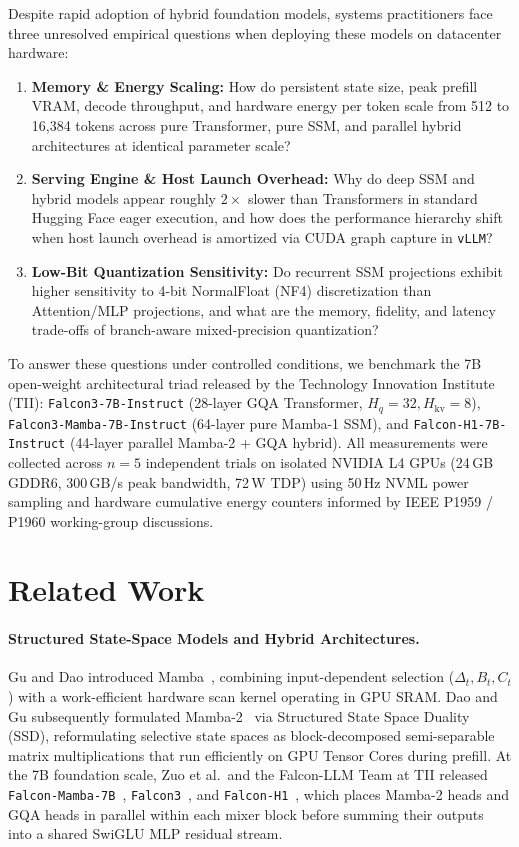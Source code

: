 \documentclass[10pt,a4paper]{article}
\begin{document}
Despite rapid adoption of hybrid foundation models, systems practitioners face three unresolved empirical questions when deploying these models on datacenter hardware:
\begin{enumerate}[leftmargin=1.5em,itemsep=1pt,topsep=2pt,parsep=0pt]
    \item \textbf{Memory \& Energy Scaling:} How do persistent state size, peak prefill VRAM, decode throughput, and hardware energy per token scale from 512 to 16,384 tokens across pure Transformer, pure SSM, and parallel hybrid architectures at identical parameter scale?
    \item \textbf{Serving Engine \& Host Launch Overhead:} Why do deep SSM and hybrid models appear roughly $2\times$ slower than Transformers in standard Hugging Face eager execution, and how does the performance hierarchy shift when host launch overhead is amortized via CUDA graph capture in \texttt{vLLM}?
    \item \textbf{Low-Bit Quantization Sensitivity:} Do recurrent SSM projections exhibit higher sensitivity to 4-bit NormalFloat (NF4) discretization than Attention/MLP projections, and what are the memory, fidelity, and latency trade-offs of branch-aware mixed-precision quantization?
\end{enumerate}

To answer these questions under controlled conditions, we benchmark the 7B open-weight architectural triad released by the Technology Innovation Institute (TII): \texttt{Falcon3-7B-Instruct} (28-layer GQA Transformer, $H_q=32, H_{\mathrm{kv}}=8$), \texttt{Falcon3-Mamba-7B-Instruct} (64-layer pure Mamba-1 SSM), and \texttt{Falcon-H1-7B-Instruct} (44-layer parallel Mamba-2 + GQA hybrid). All measurements were collected across $n=5$ independent trials on isolated NVIDIA L4 GPUs (24\,GB GDDR6, 300\,GB/s peak bandwidth, 72\,W TDP) using 50\,Hz NVML power sampling and hardware cumulative energy counters informed by IEEE P1959 / P1960 working-group discussions.

\section{Related Work}
\paragraph{Structured State-Space Models and Hybrid Architectures.}
Gu and Dao introduced Mamba~\cite{gu_mamba_2024}, combining input-dependent selection ($\Delta_t, B_t, C_t$) with a work-efficient hardware scan kernel operating in GPU SRAM. Dao and Gu subsequently formulated Mamba-2~\cite{dao_mamba2_2024} via Structured State Space Duality (SSD), reformulating selective state spaces as block-decomposed semi-separable matrix multiplications that run efficiently on GPU Tensor Cores during prefill. At the 7B foundation scale, Zuo et al.\ and the Falcon-LLM Team at TII released \texttt{Falcon-Mamba-7B}~\cite{tii_falconmamba_2024}, \texttt{Falcon3}~\cite{tii_falcon3_2024}, and \texttt{Falcon-H1}~\cite{tii_falconh1_2025}, which places Mamba-2 heads and GQA heads in parallel within each mixer block before summing their outputs into a shared SwiGLU MLP residual stream.
\end{document}
